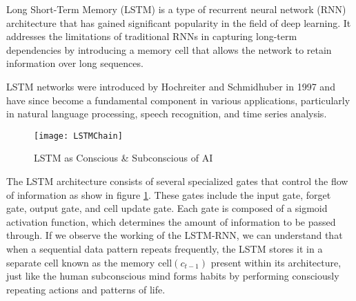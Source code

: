 Long Short-Term Memory (LSTM) is a type of recurrent neural network (RNN) architecture that has gained significant popularity in the field of deep learning. It addresses the limitations of traditional RNNs in capturing long-term dependencies by introducing a memory cell that allows the network to retain information over long sequences.

LSTM networks were introduced by Hochreiter and Schmidhuber in 1997 and have since become a fundamental component in various applications, particularly in natural language processing, speech recognition, and time series analysis\cite{article}.

\begin{figure}[H]
	\texttt{[image: LSTMChain]}
	\caption{LSTM as Conscious \& Subconscious of AI}
	\label{Fig:fig4}
\end{figure}

The LSTM architecture consists of several specialized gates that control the flow of information as show in figure \ref{Fig:fig4}. These gates include the input gate, forget gate, output gate, and cell update gate. Each gate is composed of a sigmoid activation function, which determines the amount of information to be passed through. If we observe the working of the LSTM-RNN, we can understand that when a sequential data pattern repeats frequently, the LSTM stores it in a separate cell known as the memory cell$ (c_{t-1}) $ present within its architecture, just like the human subconscious mind forms habits by performing consciously repeating actions and patterns of life.